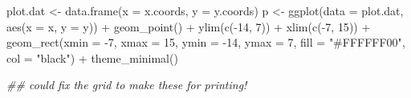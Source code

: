 \documentclass[
  letterpaper,
  DIV=11,
  numbers=noendperiod]{scrreprt}
\newenvironment{Shaded}{\begin{snugshade}}{\end{snugshade}}
\newcommand{\AttributeTok}[1]{\textcolor[rgb]{0.40,0.45,0.13}{#1}}
\newcommand{\DecValTok}[1]{\textcolor[rgb]{0.68,0.00,0.00}{#1}}
\newcommand{\DocumentationTok}[1]{\textcolor[rgb]{0.37,0.37,0.37}{\textit{#1}}}
\newcommand{\FunctionTok}[1]{\textcolor[rgb]{0.28,0.35,0.67}{#1}}
\newcommand{\NormalTok}[1]{\textcolor[rgb]{0.00,0.23,0.31}{#1}}
\newcommand{\OtherTok}[1]{\textcolor[rgb]{0.00,0.23,0.31}{#1}}
\newcommand{\SpecialCharTok}[1]{\textcolor[rgb]{0.37,0.37,0.37}{#1}}
\newcommand{\StringTok}[1]{\textcolor[rgb]{0.13,0.47,0.30}{#1}}
\begin{document}
\begin{Shaded}
\begin{Highlighting}[]
\NormalTok{plot.dat }\OtherTok{\textless{}{-}} \FunctionTok{data.frame}\NormalTok{(}\AttributeTok{x =}\NormalTok{ x.coords, }\AttributeTok{y =}\NormalTok{ y.coords)}
\NormalTok{p }\OtherTok{\textless{}{-}} \FunctionTok{ggplot}\NormalTok{(}\AttributeTok{data =}\NormalTok{ plot.dat, }\FunctionTok{aes}\NormalTok{(}\AttributeTok{x =}\NormalTok{ x, }\AttributeTok{y =}\NormalTok{ y)) }\SpecialCharTok{+}
    \FunctionTok{geom\_point}\NormalTok{() }\SpecialCharTok{+} 
    \FunctionTok{ylim}\NormalTok{(}\FunctionTok{c}\NormalTok{(}\SpecialCharTok{{-}}\DecValTok{14}\NormalTok{, }\DecValTok{7}\NormalTok{)) }\SpecialCharTok{+}
    \FunctionTok{xlim}\NormalTok{(}\FunctionTok{c}\NormalTok{(}\SpecialCharTok{{-}}\DecValTok{7}\NormalTok{, }\DecValTok{15}\NormalTok{)) }\SpecialCharTok{+} 
    \FunctionTok{geom\_rect}\NormalTok{(}\AttributeTok{xmin =} \SpecialCharTok{{-}}\DecValTok{7}\NormalTok{, }\AttributeTok{xmax =} \DecValTok{15}\NormalTok{, }\AttributeTok{ymin =} \SpecialCharTok{{-}}\DecValTok{14}\NormalTok{, }\AttributeTok{ymax =} \DecValTok{7}\NormalTok{, }
                        \AttributeTok{fill =} \StringTok{"\#FFFFFF00"}\NormalTok{, }\AttributeTok{col =} \StringTok{"black"}\NormalTok{) }\SpecialCharTok{+} 
    \FunctionTok{theme\_minimal}\NormalTok{()}


\DocumentationTok{\#\# could fix the grid to make these for printing!}


\end{Highlighting}
\end{Shaded}
\end{document}
